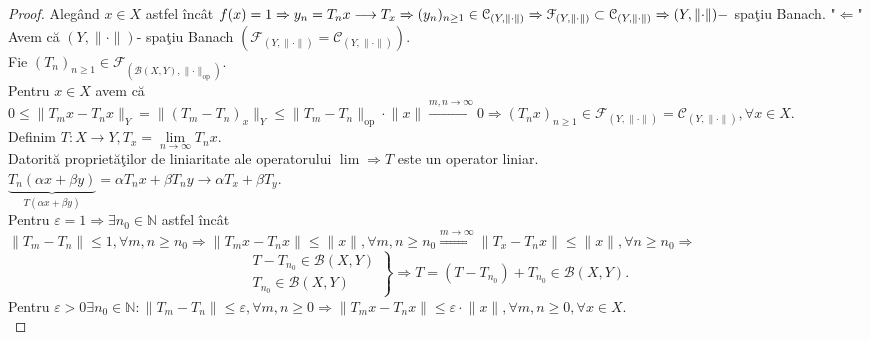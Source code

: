 \documentclass[ a4paper, 12pt]{report}
\theoremstyle{definition}
\theoremstyle{remark}
\numberwithin{equation}{section}
\begin{document}
\begin{proof}
Aleg\^and $x \in X$ astfel \^inc\^at $f(x) = 1 \Rightarrow y_n = T_n x \longrightarrow T_x \Rightarrow\\ (y_n)_{n \geq 1} \in \mathcal{C}_{(Y,\lVert \cdot \rVert)} \Rightarrow \mathcal{F}_{(Y,\lVert \cdot \rVert)} \subset \mathcal{C}_{(Y,\lVert \cdot \rVert)} \Rightarrow (Y,\lVert \cdot \rVert)-$ spa\c tiu Banach.
"$\Longleftarrow$"\\
Avem c\u a $(Y,\lVert \cdot \rVert)$- spa\c tiu Banach $(\mathcal{F}_{(Y,\lVert \cdot \rVert)}= \mathcal{C}_{(Y,\lVert \cdot \rVert)}).$\\
Fie $(T_n)_{n \geq 1} \in \mathcal{F}_{\left( \mathcal{B}(X,Y),\lVert \cdot \rVert_{\mbox{op}}\right)}.$\\
Pentru  $x \in X$ avem c\u a $0 \leq 
\lVert T_m x - T_n x \rVert_{Y} = \lVert (T_m - T_n )_x \rVert_{Y} \leq \lVert T_m-T_n  \rVert_{\mbox{op}} \cdot \lVert x \rVert \stackrel{m,n \rightarrow \infty}{\longrightarrow} 0 \Rightarrow (T_n x)_{n \geq 1} \in \mathcal{F}_{(Y,\lVert \cdot \rVert)} = \mathcal{C}_{(Y,\lVert \cdot \rVert)}, \forall x \in X.$\\
Definim $T : X \rightarrow Y, T_x = \lim\limits_{n \rightarrow \infty}T_n x.$\\
Datorit\u a propriet\u a\c tilor  de liniaritate ale operatorului $\lim \Rightarrow T$ este un operator liniar.\\
$\underbrace{T_n(\alpha x + \beta y)}_{T(\alpha x+\beta y)} = \alpha T_n x + \beta T_n y \longrightarrow \alpha T_x + \beta T_y.$\\
Pentru $\varepsilon = 1 \Rightarrow \exists n_0 \in \mathbb{N}$ astfel \^inc\^at $\lVert T_m-T_n \rVert \leq 1, \forall m,n \geq n_0 \Rightarrow \lVert T_m x - T_n x \rVert \leq \lVert x \rVert, \forall m,n \geq n_0 \stackrel{m \rightarrow \infty}{\Longrightarrow} \lVert T_x - T_n x \rVert \leq \lVert x \rVert, \forall n \geq n_0 \Rightarrow$ 
\begin{equation*}
  \left.\begin{aligned}
         T - T_{n_0} \in \mathcal{B}(X,Y)\\
         T_{n_0} \in \mathcal{B}(X,Y)
        \end{aligned}
  \right\}
  \mbox{$\Rightarrow T = (T - T_{n_0}) + T_{n_0} \in \mathcal{B}(X,Y)$.}
 \end{equation*}
Pentru $\varepsilon >0 \exists n_0 \in \mathbb{N}: \lVert T_m - T_n \rVert \leq \varepsilon, \forall m,n \geq 0 \Rightarrow  \lVert T_m x - T_n x \rVert \leq \varepsilon \cdot  \lVert x \rVert, \forall m,n \geq 0, \forall x \in X.$\\

\end{proof}
\end{document}
